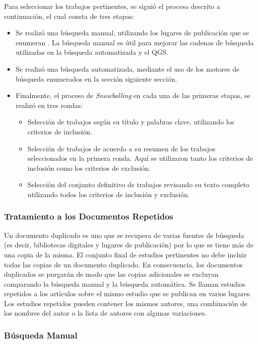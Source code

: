 Para seleccionar los trabajos pertinentes, se siguió el proceso descrito a continuación, el cual consta de tres etapas:

\begin{itemize}
\item Se realizó una búsqueda manual, utilizando los lugares de publicación que se enumeran . La búsqueda manual es útil para mejorar las cadenas de búsqueda utilizadas en la búsqueda automatizada y el QGS.
\item Se realizó una búsqueda automatizada, mediante el uso de los motores de búsqueda enumerados en la sección siguiente sección.
\item Finalmente, el proceso de \textit{Snowballing} en cada una de las primeras etapas, se realizó en tres rondas:
\begin{itemize}
\item Selección de trabajos según su título y palabras clave, utilizando los criterios de inclusión.
\item Selección de trabajos de acuerdo a su resumen de los trabajos seleccionados en la primera ronda. Aquí se utilizaron tanto los criterios de inclusión como los criterios de exclusión.
\item Selección del conjunto definitivo de trabajos revisando su texto completo utilizando todos los criterios de inclusión y exclusión.
\end{itemize}
\end{itemize}

\subsubsection{Tratamiento a los Documentos Repetidos}

Un documento duplicado es uno que se recupera de varias fuentes de búsqueda (es decir, bibliotecas digitales y lugares de publicación) por lo que se tiene más de una copia de la misma. El conjunto final de estudios pertinentes no debe incluir todas las copias de un documento duplicado. En consecuencia, los documentos duplicados se purgarán de modo que las copias adicionales se excluyan comparando la búsqueda manual y la búsqueda automática. Se llaman estudios repetidos a los artículos sobre el mismo estudio que se publican en varios lugares. Los estudios repetidos pueden contener los mismos autores, una combinación de los nombres del autor o la lista de autores con algunas variaciones. 

\subsubsection{Búsqueda Manual}\label{manual}

